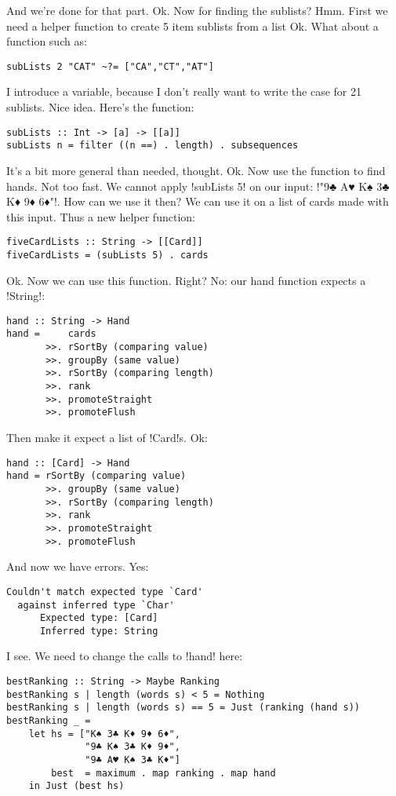 \success And we're done for that part.
\lhN Ok. Now for finding the sublists?
\lhA Hmm. First we need a helper function to create 5 item sublists from a list
\lhN Ok. What about a function such as:
\begin{lstlisting}[frame=single]
subLists 2 "CAT" ~?= ["CA","CT","AT"]
\end{lstlisting}
I introduce a variable, because I don't really want to write the case for 21 sublists.
\lhA \error Nice idea. Here's the function:
\begin{lstlisting}[frame=single]
subLists :: Int -> [a] -> [[a]]
subLists n = filter ((n ==) . length) . subsequences 
\end{lstlisting}
\success It's a bit more general than needed, thought.
\lhN Ok. Now use the function to find hands.
\lhA Not too fast. We cannot apply \il!subLists 5! on our input: \il!"9♣ A♥ K♠ 3♣ K♦ 9♦ 6♦"!.
\lhN How can we use it then?
\lhA We can use it on a list of cards made with this input. Thus a new helper function:
\begin{lstlisting}[frame=single]
fiveCardLists :: String -> [[Card]]
fiveCardLists = (subLists 5) . cards
\end{lstlisting}
\lhN Ok. Now we can use this function. Right?
\lhA No: our hand function expects a \il!String!:
\begin{lstlisting}[frame=single]
hand :: String -> Hand
hand =     cards
       >>. rSortBy (comparing value)
       >>. groupBy (same value)
       >>. rSortBy (comparing length)
       >>. rank
       >>. promoteStraight
       >>. promoteFlush    
\end{lstlisting}
\lhN Then make it expect a list of \il!Card!s.
\lhA Ok:
\begin{lstlisting}[frame=single]
hand :: [Card] -> Hand
hand = rSortBy (comparing value)
       >>. groupBy (same value)
       >>. rSortBy (comparing length)
       >>. rank
       >>. promoteStraight
       >>. promoteFlush    
\end{lstlisting}
\error And now we have errors.
\lhN Yes:
\begin{small}
\begin{verbatim}
Couldn't match expected type `Card' 
  against inferred type `Char'
      Expected type: [Card]
      Inferred type: String
\end{verbatim}
\end{small}
\lhA \error I see. We need to change the calls to \il!hand! here:
\begin{lstlisting}[frame=single]
bestRanking :: String -> Maybe Ranking
bestRanking s | length (words s) < 5 = Nothing
bestRanking s | length (words s) == 5 = Just (ranking (hand s))
bestRanking _ = 
    let hs = ["K♠ 3♣ K♦ 9♦ 6♦", 
              "9♣ K♠ 3♣ K♦ 9♦", 
              "9♣ A♥ K♠ 3♣ K♦"]
        best  = maximum . map ranking . map hand
    in Just (best hs)
\end{lstlisting}
